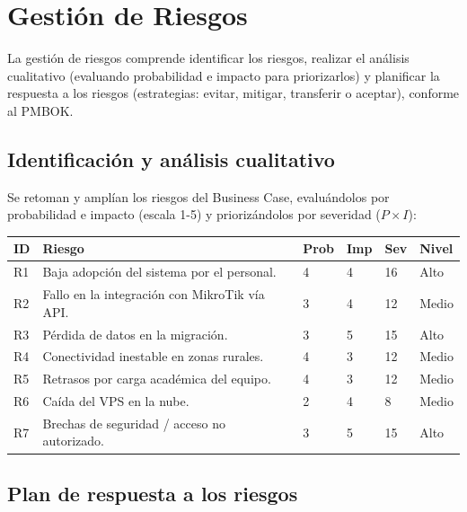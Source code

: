 \section{Gestión de Riesgos}
\label{sec:riesgos-plan}

La gestión de riesgos comprende identificar los riesgos, realizar el análisis
cualitativo (evaluando probabilidad e impacto para priorizarlos) y planificar la
respuesta a los riesgos (estrategias: evitar, mitigar, transferir o aceptar), conforme
al PMBOK.

\subsection{Identificación y análisis cualitativo}

Se retoman y amplían los riesgos del Business Case, evaluándolos por probabilidad e
impacto (escala 1-5) y priorizándolos por severidad ($P\times I$):

\begin{center}
\label{tab:riesgos-identificacion}
\begin{tabularx}{\textwidth}{C{1cm} X C{1.1cm} C{1.1cm} C{1.1cm} C{1.6cm}}
\toprule
\textbf{ID} & \textbf{Riesgo} & \textbf{Prob} & \textbf{Imp} & \textbf{Sev} &
\textbf{Nivel} \\
\midrule
R1 & Baja adopción del sistema por el personal. & 4 & 4 & 16 & Alto \\
R2 & Fallo en la integración con MikroTik vía API. & 3 & 4 & 12 & Medio \\
R3 & Pérdida de datos en la migración. & 3 & 5 & 15 & Alto \\
R4 & Conectividad inestable en zonas rurales. & 4 & 3 & 12 & Medio \\
R5 & Retrasos por carga académica del equipo. & 4 & 3 & 12 & Medio \\
R6 & Caída del VPS en la nube. & 2 & 4 & 8 & Medio \\
R7 & Brechas de seguridad / acceso no autorizado. & 3 & 5 & 15 & Alto \\
\bottomrule
\end{tabularx}
\end{center}

\subsection{Plan de respuesta a los riesgos}

